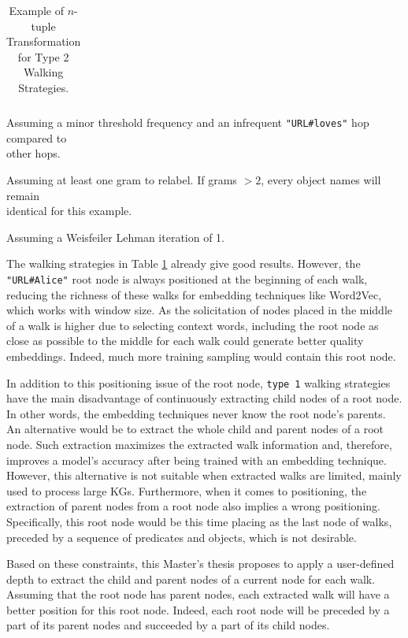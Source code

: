 \begin{table}[!ht]
\begin{threeparttable}[t]
{\begin{tabular}{cll}
        \bottomrule
      \end{tabular}
    }%
    \begin{tablenotes}
    \item[1]
      Assuming a minor threshold frequency and an infrequent
      {\footnotesize\texttt{"URL\#loves"}} hop compared to \\ other hops.
    \item[2] Assuming at least one gram to relabel. If grams $> 2$, every object
      names will remain \\ identical for this example.
    \item[3] Assuming a Weisfeiler Lehman iteration of 1.
    \end{tablenotes}
  \end{threeparttable}%
  \caption{Example of $n$-tuple Transformation for Type 2 Walking Strategies.}
  \label{tab:walking:strategies}
\end{table}

The walking strategies in Table \ref{tab:walking:strategies} already give good
results. However, the {\footnotesize\texttt{"URL\#Alice"}} root node is always
positioned at the beginning of each walk, reducing the richness of these walks
for embedding techniques like Word2Vec, which works with window size. As the
solicitation of nodes placed in the middle of a walk is higher due to selecting
context words, including the root node as close as possible to the middle for
each walk could generate better quality embeddings. Indeed, much more training
sampling would contain this root node.

In addition to this positioning issue of the root node, \texttt{type 1} walking
strategies have the main disadvantage of continuously extracting child nodes of
a root node. In other words, the embedding techniques never know the root node's
parents. An alternative would be to extract the whole child and parent nodes of
a root node. Such extraction maximizes the extracted walk information and,
therefore, improves a model's accuracy after being trained with an embedding
technique. However, this alternative is not suitable when extracted walks are
limited, mainly used to process large KGs. Furthermore, when it comes to
positioning, the extraction of parent nodes from a root node also implies a
wrong positioning. Specifically, this root node would be this time placing as
the last node of walks, preceded by a sequence of predicates and objects, which
is not desirable.

Based on these constraints, this Master's thesis proposes to apply a
user-defined depth to extract the child and parent nodes of a current node for
each walk. Assuming that the root node has parent nodes, each extracted walk
will have a better position for this root node. Indeed, each root node will be
preceded by a part of its parent nodes and succeeded by a part of its child
nodes.

